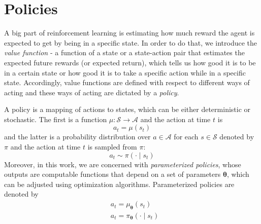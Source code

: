 \section{Policies}
A big part of reinforcement learning is estimating how much reward the agent is expected to get by being in a specific state. In order to do that, we introduce the \textit{value function} - a function of a state or a state-action pair that estimates the expected future rewards (or expected return), which tells us how good it is to be in a certain state or how good it is to take a specific action while in a specific state. Accordingly, value functions are defined with respect to different ways of acting and these ways of acting are dictated by a \textit{policy}. 

A policy is a mapping of actions to states, which can be either deterministic or stochastic. The first is a function $\mu \colon \mathcal{S} \to \mathcal{A}$ and the action at time $t$ is
\[
      a_t = \mu(s_t)      
\]
and the latter is a probability distribution over $a \in \mathcal{A}$ for each $s \in \mathcal{S}$ denoted by $\pi$ and the action at time $t$ is sampled from $\pi$:
\[
      a_t \sim \pi(\cdot \mid s_t)      
\]
Moreover, in this work, we are concerned with \textit{parameterized policies}, whose outputs are computable functions that depend on a set of parameters $\boldsymbol\theta$, which can be adjusted using optimization algorithms. Parameterized policies are denoted by
\begin{align*}
      &a_t = \mu_{\boldsymbol\theta}(s_t)\\
      &a_t = \pi_{\boldsymbol\theta}(\cdot \mid s_t)\\
\end{align*}

